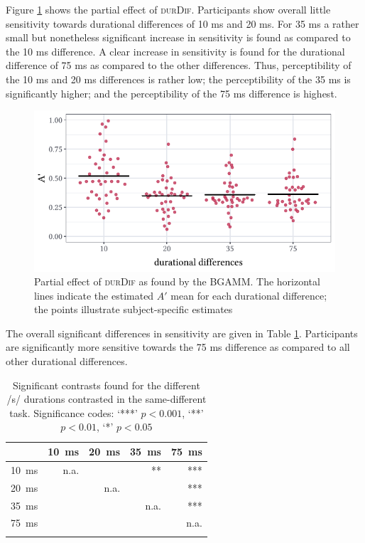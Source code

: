 Figure \ref{fig:6_4} shows the partial effect of \textsc{durDif}. Participants show overall little sensitivity towards durational differences of 10 ms and 20 ms. For 35 ms a rather small but nonetheless significant increase in sensitivity is found as compared to the 10 ms difference. A clear increase in sensitivity is found for the durational difference of 75 ms as compared to the other differences. Thus, perceptibility of the 10 ms and 20 ms differences is rather low; the perceptibility of the 35 ms is significantly higher; and the perceptibility of the 75 ms difference is highest.

\begin{figure}
    \centering
    \includegraphics[]{figures/fig6.4.pdf}
    \caption{Partial effect of \textsc{durDif} as found by the BGAMM. The horizontal lines indicate the estimated $A'$ mean for each durational difference; the points illustrate subject-specific estimates}
    \label{fig:6_4}
\end{figure}

The overall significant differences in sensitivity are given in Table \ref{tab:6.12}. Participants are significantly more sensitive towards the 75 ms difference as compared to all other durational differences. 

\begin{table}\fontsize{10}{11}
\caption{Significant contrasts found for the different /s/ durations contrasted in the same-different task. Significance codes: `***' $p < 0.001$, `**' $p < 0.01$, `*' $p < 0.05$}
\label{tab:6.12}
\centering
\begin{tabular}{lrrrr} 
\lsptoprule
\textbf{~} & 10~ms & 20~ms & 35~ms & 75~ms  \\ 
\midrule
10~ms      & n.a.  & ~     & **    & ***    \\
20~ms      & ~     & n.a.  & ~     & ***    \\
35~ms      & ~     & ~     & n.a.  & ***    \\
75~ms      & ~     & ~     & ~     & n.a.   \\
\lspbottomrule
\end{tabular}
\end{table}

